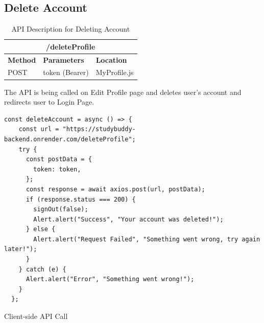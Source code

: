 \subsection{Delete Account}
\begin{table}[H]
	\centering
	\begin{tabular}{ |p{}|p{}|p{}| }
		\hline
            \multicolumn{3}{|c|}{/deleteProfile} \\
            \hline
		\textbf{Method} & \textbf{Parameters} & \textbf{Location}\\
            \hline
		  POST & token (Bearer) & MyProfile.js\\
            \hline
	\end{tabular}
	\caption{API Description for Deleting Account}
	\label{tab:delete}
\end{table}
The API is being called on Edit Profile page and deletes user's account and redirects user to Login Page.
\begin{listing}[H]
\begin{verbatim} 
const deleteAccount = async () => {
    const url = "https://studybuddy-backend.onrender.com/deleteProfile";
    try {
      const postData = {
        token: token,
      };
      const response = await axios.post(url, postData);
      if (response.status === 200) {
        signOut(false);
        Alert.alert("Success", "Your account was deleted!");
      } else {
        Alert.alert("Request Failed", "Something went wrong, try again later!");
      }
    } catch (e) {
      Alert.alert("Error", "Something went wrong!");
    }
  };
\end{verbatim}
\caption{Client-side API Call}
\label{src:delete}
\end{listing}

